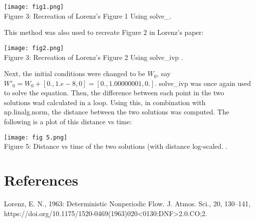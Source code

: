 \documentclass{article}
\begin{document}
\texttt{[image: fig1.png]}
\\\caption{Figure 3: Recreation of Lorenz's Figure 1 Using solve_\ivp .}
  \label{fig:fig3}

\hfill \break

This method was also used to recreate Figure 2 in Lorenz's paper:

\texttt{[image: fig2.png]}
\\\caption{Figure 3: Recreation of Lorenz's Figure 2 Using solve_ivp .}
  \label{fig:fig2}

\hfill \break



Next, the initial conditions were changed to be $W_0$, say $W'_0 = W_0+[0., 1.e-8, 0] = [0., 1.00000001, 0.]$. solve\_ivp was once again used to solve the equation. Then, the difference between each point in the two solutions wad calculated in a loop. Using this, in combination with np.linalg.norm,  the distance between the two solutions was computed. The following is a plot of this distance vs time: 


\texttt{[image: fig 5.png]}
\\\caption{Figure 5: Distance vs time of the two solutions (with distance log-scaled.  .}
  \label{fig:fig5}

\section{References}
Lorenz, E. N., 1963: Deterministic Nonperiodic Flow. J. Atmos. Sci., 20, 130–141, https://doi.org/10.1175/1520-0469(1963)020<0130:DNF>2.0.CO;2.
\end{document}
